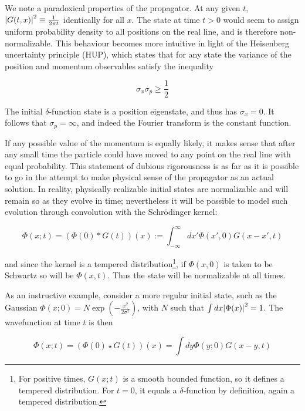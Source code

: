 \documentclass{article}
\newcommand{\intR}{\int_{-\infty}^\infty}
\begin{document}
We note a paradoxical properties of the propagator. At any given $t$, $\abs{G(t,x)}^2 \equiv \frac{1}{2\pi t}$ identically for all $x$. The state at time $t>0$ would seem to assign uniform probability density to all positions on the real line, and is therefore non-normalizable. This behaviour becomes more intuitive in light of the Heisenberg uncertainty principle (HUP), which states that for any state the variance of the position and momentum observables satisfy the inequality

\begin{equation}
    \sigma_x \sigma_p \geq \frac{1}{2}
\end{equation}

The initial $\delta$-function state is a position eigenstate, and thus has $\sigma_x = 0$. It follows that $\sigma_p = \infty$, and indeed the Fourier transform is the constant function.

If any possible value of the momentum is equally likely, it makes sense that after any small time the particle could have moved to any point on the real line with equal probability. This statement of dubious rigorousness is as far as it is possible to go in the attempt to make physical sense of the propagator as an actual solution. In reality, physically realizable initial states are normalizable and will remain so as they evolve in time; nevertheless it will be possible to model such evolution through convolution with the Schr\"odinger kernel:

\begin{equation}
    \Phi(x;t) = \left(\Phi(0) * G(t) \right)(x) := \intR dx' \Phi(x',0) G(x-x',t)
\end{equation}

and since the kernel is a tempered distribution\footnote{For positive times, $G(x;t)$ is a smooth bounded function, so it defines a tempered distribution. For $t=0$, it equals a $\delta$-function by definition, again a tempered distribution.}, if $\Phi(x,0)$ is taken to be Schwartz so will be $\Phi(x,t)$. Thus the state will be normalizable at all times.

As an instructive example, consider a more regular initial state, such as the Gaussian $\Phi(x;0) = N \exp(-\frac{x^2}{2\sigma^2} )$, with $N$ such that $\int dx \abs{\Phi(x)}^2 = 1$. The wavefunction at time $t$ is then

\begin{equation}
    \Phi(x;t) = \left( \Phi(0) \star G(t) \right)(x) = \int dy \Phi(y;0) G(x-y,t)
\end{equation}
\end{document}
